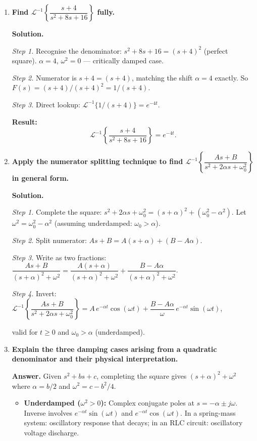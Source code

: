 \documentclass[12pt,a4paper]{article}
\begin{document}
\begin{enumerate}[leftmargin=*, label=\textbf{Q\arabic*.}]
\item \textbf{Find $\mathcal{L}^{-1}\!\left\{\dfrac{s+4}{s^2+8s+16}\right\}$ fully.}

\textbf{Solution.}

\textit{Step 1.} Recognise the denominator: $s^2+8s+16 = (s+4)^2$ (perfect square).
$\alpha = 4$, $\omega^2 = 0$ --- critically damped case.

\textit{Step 2.} Numerator is $s+4 = (s+4)$, matching the shift $\alpha = 4$ exactly.
So $F(s) = (s+4)/(s+4)^2 = 1/(s+4)$.

\textit{Step 3.} Direct lookup: $\mathcal{L}^{-1}\{1/(s+4)\} = e^{-4t}$.

\textbf{Result:}
\[
  \mathcal{L}^{-1}\!\left\{\frac{s+4}{s^2+8s+16}\right\} = e^{-4t}.
\]

\item \textbf{Apply the numerator splitting technique to find
      $\mathcal{L}^{-1}\!\left\{\dfrac{As+B}{s^2+2\alpha s+\omega_0^2}\right\}$
      in general form.}

\textbf{Solution.}

\textit{Step 1.} Complete the square: $s^2+2\alpha s + \omega_0^2 = (s+\alpha)^2 + (\omega_0^2 - \alpha^2)$.
Let $\omega^2 = \omega_0^2 - \alpha^2$ (assuming underdamped: $\omega_0 > \alpha$).

\textit{Step 2.} Split numerator:
$As + B = A(s+\alpha) + (B - A\alpha)$.

\textit{Step 3.} Write as two fractions:
$\dfrac{As+B}{(s+\alpha)^2+\omega^2}
= \dfrac{A(s+\alpha)}{(s+\alpha)^2+\omega^2} + \dfrac{B-A\alpha}{(s+\alpha)^2+\omega^2}$.

\textit{Step 4.} Invert:
$\mathcal{L}^{-1}\!\left\{\dfrac{As+B}{s^2+2\alpha s+\omega_0^2}\right\}
= A\,e^{-\alpha t}\cos(\omega t) + \dfrac{B-A\alpha}{\omega}\,e^{-\alpha t}\sin(\omega t)$,

\noindent valid for $t \geq 0$ and $\omega_0 > \alpha$ (underdamped).

\item \textbf{Explain the three damping cases arising from a quadratic denominator
      and their physical interpretation.}

\textbf{Answer.}
Given $s^2 + bs + c$, completing the square gives $(s+\alpha)^2 + \omega^2$
where $\alpha = b/2$ and $\omega^2 = c - b^2/4$.

\begin{itemize}[leftmargin=*]
  \item \textbf{Underdamped ($\omega^2 > 0$):} Complex conjugate poles at
        $s = -\alpha \pm j\omega$. Inverse involves $e^{-\alpha t}\sin(\omega t)$ and
        $e^{-\alpha t}\cos(\omega t)$. In a spring-mass system: oscillatory response that
        decays; in an RLC circuit: oscillatory voltage discharge.


\end{itemize}
\end{enumerate}
\end{document}
